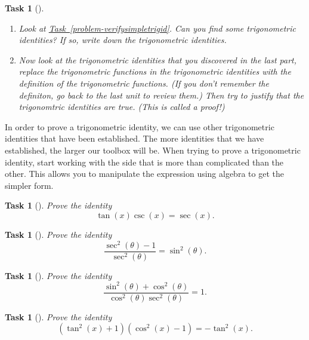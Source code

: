 \documentclass[10pt,]{article}
\theoremstyle{plain}
\newtheorem{proposition}[theorem]{Task}
\theoremstyle{definition}
\numberwithin{equation}{section}
\begin{document}
\begin{proposition}[{}]\label{proposition-72}
\leavevmode%
\begin{enumerate}
\item\hypertarget{li-287}{}Look at \hyperref[problem-verifysimpletrigid]{Task~\ref{problem-verifysimpletrigid}}. Can you find some trigonometric identities? If so, write down the trigonometric identities.%
\item\hypertarget{li-288}{}Now look at the trigonometric identities that you discovered in the last part, replace the trigonometric functions in the trigonometric identities with the definition of the trigonometric functions. (If you don't remember the definiton, go back to the last unit to review them.) Then try to justify that the trigonomtric identities are true. (This is called a proof!)%
\end{enumerate}
\end{proposition}
\hypertarget{p-135}{}%
In order to prove a trigonometric identity, we can use other trigonometric identities that have been established. The more identities that we have established, the larger our toolbox will be. When trying to prove a trigonometric identity, start working with the side that is more than complicated than the other. This allows you to manipulate the expression using algebra to get the simpler form.%
\begin{proposition}[{}]\label{proposition-73}
\hypertarget{p-136}{}%
Prove the identity%
\begin{equation*}
\tan(x)\csc(x) = \sec(x)\text{.}
\end{equation*}
%
\end{proposition}
\begin{proposition}[{}]\label{proposition-74}
\hypertarget{p-137}{}%
Prove the identity%
\begin{equation*}
\frac{\sec^2(\theta)-1}{\sec^2(\theta)} = \sin^2(\theta)\text{.}
\end{equation*}
%
\end{proposition}
\begin{proposition}[{}]\label{proposition-75}
\hypertarget{p-138}{}%
Prove the identity%
\begin{equation*}
\frac{\sin^2(\theta)+\cos^2(\theta)}{\cos^2(\theta)\sec^2(\theta)} = 1\text{.}
\end{equation*}
%
\end{proposition}
\begin{proposition}[{}]\label{proposition-76}
\hypertarget{p-139}{}%
Prove the identity%
\begin{equation*}
(\tan^2(x)+1)(\cos^2(x)-1)=-\tan^2(x)\text{.}
\end{equation*}
%
\end{proposition}
\end{document}
